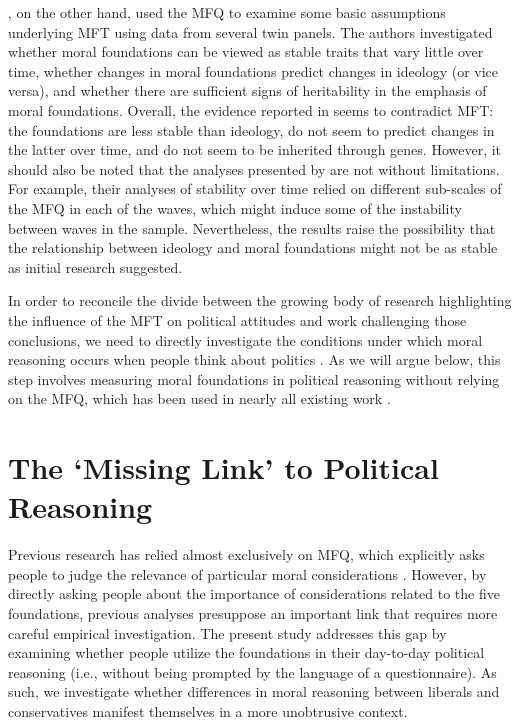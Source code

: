 \documentclass[12pt]{article}
\begin{document}
\citet{smith2016intuitive}, on the other hand, used the MFQ to examine some basic assumptions underlying MFT using data from several twin panels. The authors investigated whether moral foundations can be viewed as stable traits that vary little over time, whether changes in moral foundations predict changes in ideology (or vice versa), and whether there are sufficient signs of heritability in the emphasis of moral foundations. Overall, the evidence reported in \citet{smith2016intuitive} seems to contradict MFT: the foundations are less stable than ideology, do not seem to predict changes in the latter over time, and do not seem to be inherited through genes. However, it should also be noted that the analyses presented by \citet{smith2016intuitive} are not without limitations. For example, their analyses of stability over time relied on different sub-scales of the MFQ in each of the waves, which might induce some of the instability between waves in the sample. Nevertheless, the results raise the possibility that the relationship between ideology and moral foundations might not be as stable as initial research suggested.

In order to reconcile the divide between the growing body of research highlighting the influence of the MFT on political attitudes and work challenging those conclusions, we need to directly investigate the conditions under which moral reasoning occurs when people think about politics  \citep[e.g.][]{smith2016intuitive}. As we will argue below, this step involves measuring moral foundations in political reasoning without relying on the MFQ, which has been used in nearly all existing work \citep[but see][]{clifford2014linking}.


\section*{The `Missing Link' to Political Reasoning}

Previous research has relied almost exclusively on MFQ, which explicitly asks people to judge the relevance of particular moral considerations \citep[e.g.][]{graham2011mapping}. However, by directly asking people about the importance of considerations related to the five foundations, previous analyses presuppose an important link that requires more careful empirical investigation. The present study addresses this gap by examining whether people utilize the foundations in their day-to-day political reasoning (i.e., without being prompted by the language of a questionnaire). As such, we investigate whether differences in moral reasoning between liberals and conservatives manifest themselves in a more unobtrusive context.
\end{document}
